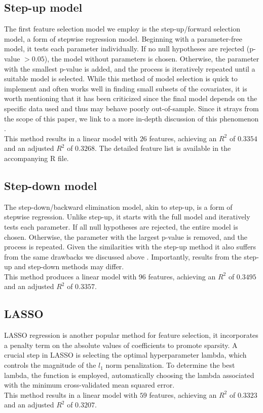 \documentclass[hidelinks,12pt]{article}
\newcommand{\inlinecode}[1]{%
    \tikz[baseline=(text.base)]{
        \node[inner sep=2pt, fill=gray!15, rounded corners, font=\ttfamily](text){#1};
    }%
}
\begin{document}
\subsection{Step-up model}
The first feature selection model we employ is the step-up/forward selection model, a form of stepwise regression model. Beginning with a parameter-free model, it tests each parameter individually. If no null hypotheses are rejected (p-value $> 0.05$), the model without parameters is chosen. Otherwise, the parameter with the smallest p-value is added, and the process is iteratively repeated until a suitable model is selected. While this method of model selection is quick to implement and often works well in finding small subsets of the covariates, it is worth mentioning that it has been criticized since the final model depends on the specific data used and thus may behave poorly out-of-sample. Since it strays from the scope of this paper, we link to a more in-depth discussion of this phenomenon \cite{Smith2018-uf}.\\
This method results in a linear model with $26$ features, achieving an $R^2$ of $0.3354$ and an adjusted $R^2$ of $0.3268$. The detailed feature list is available in the accompanying R file.

\subsection{Step-down model}
The step-down/backward elimination model, akin to step-up, is a form of stepwise regression. Unlike step-up, it starts with the full model and iteratively tests each parameter. If all null hypotheses are rejected, the entire model is chosen. Otherwise, the parameter with the largest p-value is removed, and the process is repeated. Given the similarities with the step-up method it also suffers from the same drawbacks we discussed above \cite{Smith2018-uf}. Importantly, results from the step-up and step-down methods may differ.\\
This method produces a linear model with 96 features, achieving an $R^2$ of $0.3495$ and an adjusted $R^2$ of $0.3357$.

\subsection{LASSO}
LASSO regression is another popular method for feature selection, it incorporates a penalty term on the absolute values of coefficients to promote sparsity. A crucial step in LASSO is selecting the optimal hyperparameter lambda, which controls the magnitude of the $l_1$ norm penalization. To determine the best lambda, the function \inlinecode{cv.glmnet()} is employed, automatically choosing the lambda associated with the minimum cross-validated mean squared error.\\
This method results in a linear model with $59$ features, achieving an $R^2$ of $0.3323$ and an adjusted $R^2$ of $0.3207$.
\end{document}
